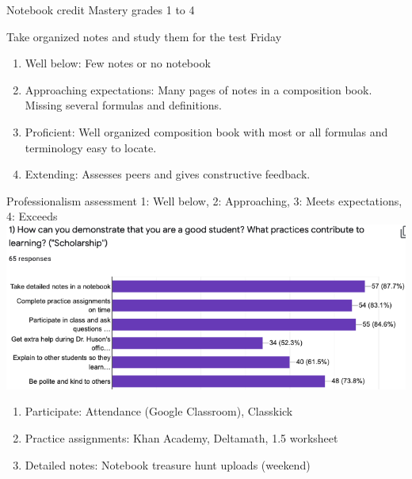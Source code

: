 \begin{frame}{Notebook credit}
{Mastery grades 1 to 4}
\begin{block}{Take organized notes and study them for the test Friday}
    \begin{enumerate}
      \item Well below: Few notes or no notebook
      \item Approaching expectations: Many pages of notes in a composition book. Missing several formulas and definitions.
      \item Proficient: Well organized composition book with most or all formulas and terminology easy to locate.
      \item Extending: Assesses peers and gives constructive feedback.
      \end{enumerate}
    \end{block}
    \end{frame}

\begin{frame}{Professionalism assessment}
  {1: Well below, 2: Approaching, 3: Meets expectations, 4: Exceeds}
  \includegraphics[width=.95\textwidth]{../graphics/scholarship-bar-chart.png}
  \begin{enumerate}
    \item Participate: Attendance (Google Classroom), Classkick
    \item Practice assignments: Khan Academy, Deltamath, 1.5 worksheet
    \item Detailed notes: Notebook treasure hunt uploads (weekend)
  \end{enumerate}
\end{frame}

